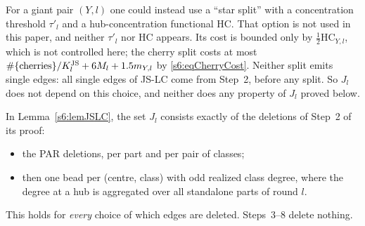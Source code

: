 \begin{remark}\label{s6:remStar}
For a giant pair $(Y,l)$ one could instead use a ``star split'' with a concentration threshold $\tau'_l$ and a hub-concentration functional $\mathrm{HC}$. That option is not used in this paper, and neither $\tau'_l$ nor $\mathrm{HC}$ appears. Its cost is bounded only by $\frac12\mathrm{HC}_{Y,l}$, which is not controlled here; the cherry split costs at most $\#\{\text{cherries}\}/K^{\mathrm{JS}}_l+6M_l+1.5m_{Y,l}$ by \eqref{s6:eqCherryCost}. Neither split emits single edges: all single edges of JS-LC come from Step~2, before any split. So $J_l$ does not depend on this choice, and neither does any property of $J_l$ proved below.
\deps{\ref{s6:lemJSLC}}
\end{remark}

\begin{lemma}\label{s6:lemJplus}
In Lemma~\ref{s6:lemJSLC}, the set $J_l$ consists exactly of the deletions of Step~2 of its proof:
\begin{itemize}
\item the PAR deletions, per part and per pair of classes;
\item then one bead per (centre, class) with odd realized class degree, where the degree at a hub is aggregated over all standalone parts of round $l$.
\end{itemize}
This holds for \emph{every} choice of which edges are deleted. Steps~3--8 delete nothing.


\end{lemma}
